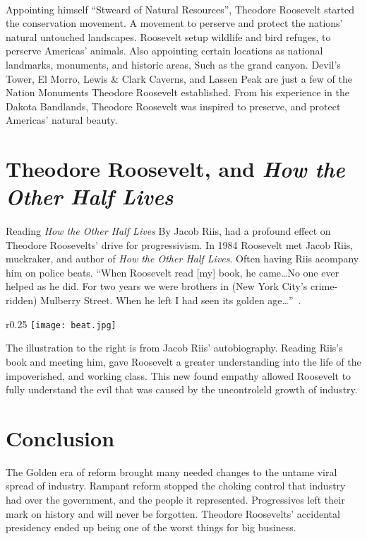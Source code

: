 \paragraph{}
Appointing himself ``Stweard of Natural Resources'', Theodore Roosevelt
started the conservation movement. A movement to perserve and protect
the nations' natural untouched landscapes. Roosevelt setup wildlife and
bird refuges, to perserve Americas' animals. Also appointing certain
locations as national landmarks, monuments, and historic areas, Such
as the grand canyon. Devil's Tower, El Morro, Lewis \& Clark Caverns, and
Lassen Peak are just a few of the Nation Monuments Theodore Roosevelt
established. From his experience in the Dakota Bandlands, Theodore Roosevelt
was inspired to preserve, and protect Americas' natural beauty.

\section{Theodore Roosevelt, and \textit{How the Other Half Lives}}
\paragraph{}
Reading \textit{How the Other Half Lives} By Jacob Riis, had a profound
effect on Theodore Roosevelts' drive for progressivism. In 1984 Roosevelt
met Jacob Riis, muckraker, and author of \textit{How the Other Half Lives}.
Often having Riis acompany him on police beats. ``When Roosevelt read [my]
book, he came\ldots{}No one ever helped as he did. For two years we were brothers
in (New York City's crime-ridden) Mulberry Street. When he left I had seen its
golden age\ldots{}''~\cite{jacobriis1901}.\\

\begin{wrapfigure}{r}{0.25\textwidth}
	\centering
	\texttt{[image: beat.jpg]}
\end{wrapfigure}

The illustration to the right is from Jacob Riis' autobiography.
\cite{jacobriis1901}
Reading Riis's book and meeting him, gave Roosevelt a greater understanding
into the life of the impoverished, and working class. This new found empathy
allowed Roosevelt to fully understand the evil that was caused by the
uncontroleld growth of industry.

\section{Conclusion}
The Golden era of reform brought many needed changes to the untame
viral spread of industry. Rampant reform stopped the choking control
that industry had over the government, and the people it represented.
Progressives left their mark on history and will never be forgotten.
Theodore Roosevelts' accidental presidency ended up being one of the
worst things for big business.

\newpage
\printbibliography{}
